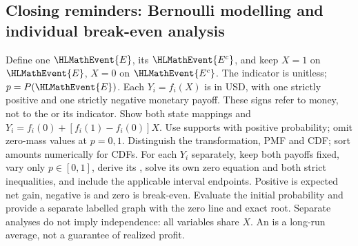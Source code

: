 \subsection*{Closing reminders: Bernoulli modelling and individual break-even analysis}
Define one  $\HLMathEvent{E}$, its  $\HLMathEvent{E^c}$, and keep $X=1$ on $\HLMathEvent{E}$, $X=0$ on $\HLMathEvent{E^c}$.
The indicator is unitless; $p=P(\HLMathEvent{E})$. Each $Y_i=f_i(X)$ is in USD, with one
strictly positive and one strictly negative monetary payoff. These signs refer
to money, not to the  or its indicator. Show both state mappings and
$Y_i=f_i(0)+[f_i(1)-f_i(0)]X$.
Use supports with positive probability; omit zero-mass values at $p=0,1$.
Distinguish the transformation, PMF and CDF; sort amounts numerically for CDFs.
For each $Y_i$ separately, keep both payoffs fixed, vary only $p\in\left[0,1\right]$,
derive its , solve its own zero equation and both strict inequalities,
and include the applicable interval endpoints. Positive  is expected
net gain, negative is  and zero is break-even. Evaluate the initial
probability and provide a separate labelled graph with the zero line and exact root.
Separate analyses do not imply independence: all variables share $X$.
An  is a long-run average, not a guarantee of realized profit.


